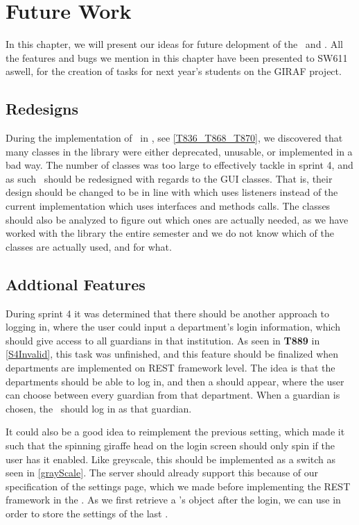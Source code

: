 \chapter{Future Work}\label{fwork}
In this chapter, we will present our ideas for future delopment of the
\lapp\ and \clib. All the features and bugs we mention in this chapter have been
presented to SW611 aswell, for the creation of tasks for next year's students on
the GIRAF project.

\section{Redesigns}
During the implementation of \rlib\ in \clib, see
\autoref{T836_T868_T870}, we discovered that many classes in the library were
either deprecated, unusable, or implemented in a bad way. The number of classes
was too large to effectively tackle in sprint 4, and as such \clib\ should be
redesigned with regards to the GUI classes. That is, their design should be
changed to be in line with  which uses listeners instead
of the current implementation which uses interfaces and methods calls.
The classes should also be analyzed to figure out which ones are actually
needed, as we have worked with the library the entire semester and we do not
know which of the classes are actually used, and for what.

\section{Addtional Features}
During sprint 4 it was determined that there should be another approach to
logging in, where the user could input a department's login information, which
should give access to all guardians in that institution. As seen in
\textbf{T889} in \autoref{S4Invalid}, this task was unfinished, and this feature
should be finalized when departments are implemented on REST framework level.
The idea is that the departments should be able to log in, and then a
 should appear, where the user can choose between
every guardian from that department. When a guardian is chosen, the \lapp\
should log in as that guardian.\nl

It could also be a good idea to reimplement the previous setting, which made it
such that the spinning giraffe head on the login screen should only spin if the
user has it enabled. Like greyscale, this should be implemented as a switch as
seen in \autoref{grayScale}. The server should already support this
because of our specification of the settings page, which we made before
implementing the REST framework in the \textc{Launcher}. As we first retrieve a
\ttt{User}'s \ttt{Settings} object after the login, we can use
 in order to store the settings of the last .

